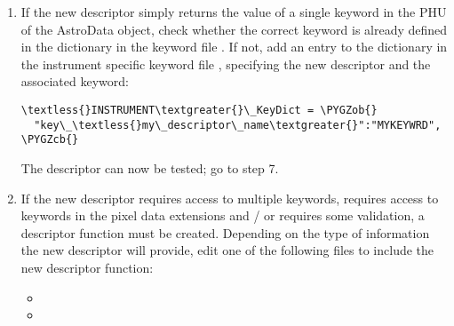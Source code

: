 \documentclass[letterpaper,10pt,english]{sphinxmanual}
\def\PYGZob{\char`\{}
\def\PYGZcb{\char`\}}
\begin{document}
\begin{enumerate}
\begin{Verbatim}[commandchars=\\\{\}]
class \textless{}INSTRUMENT\textgreater{}\_DescriptorCalc(GEMINI\_DescriptorCalc):
    \# Updating the global key dictionary with the local key dictionary
    \# associated with this descriptor class
    \_update\_stdkey\_dict = \textless{}INSTRUMENT\textgreater{}\_KeyDict
\end{Verbatim}

and an  file:

\begin{Verbatim}[commandchars=\\\{\}]
\textless{}INSTRUMENT\textgreater{}\_KeyDict = \PYGZob{}\PYGZcb{}
\end{Verbatim}

In addition, add an appropriate entry to the 
file.

\item {} 
If the new descriptor simply returns the value of a single keyword in the
PHU of the AstroData object, check whether the correct keyword is already
defined in the  dictionary in the keyword file
. If not, add an entry to the
 dictionary in the instrument specific keyword
file , specifying the new descriptor and the
associated keyword:

\begin{Verbatim}[commandchars=\\\{\}]
\textless{}INSTRUMENT\textgreater{}\_KeyDict = \PYGZob{}
  "key\_\textless{}my\_descriptor\_name\textgreater{}":"MYKEYWRD",
\PYGZcb{}
\end{Verbatim}

The descriptor can now be tested; go to step 7.

\item {} 
If the new descriptor requires access to multiple keywords, requires
access to keywords in the pixel data extensions and / or requires some
validation, a descriptor function must be created. Depending on the type
of information the new descriptor will provide, edit one of the following
files to include the new descriptor function:
\begin{itemize}
\item {} 

\item {} 


\end{itemize}
\end{enumerate}
\end{document}
